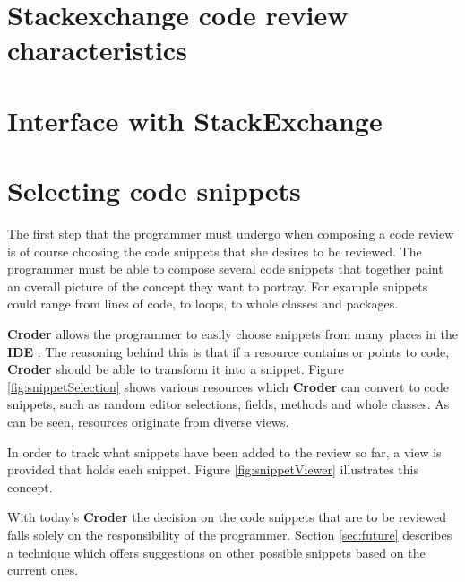 \documentclass{sigchi}
\newcommand{\croder}{\textbf{Croder }}
\newcommand{\IDE}{\textbf{IDE }}
\begin{document}
\section{Stackexchange code review characteristics}
\section{Interface with StackExchange}

\section{Selecting code snippets}

 The first step that the programmer must undergo when composing a code review is of course choosing the code snippets that she desires to be reviewed. The programmer must be able to compose several code snippets that together paint an overall picture of the concept they want to portray. For example snippets could range from lines of code, to loops, to whole classes and packages.

 \croder allows the programmer to easily choose snippets from many places in the \IDE. The reasoning behind this is that if a resource contains or points to code, \croder should be able to transform it into a snippet. Figure \ref{fig:snippetSelection} shows  various resources which \croder can convert to code snippets, such as random editor selections, fields, methods and whole classes. As can be seen, resources originate from diverse views.

 In order to track what snippets have been added to the review so far, a view is provided that holds each snippet. Figure \ref{fig:snippetViewer} illustrates this concept.
 
 With today's \croder the decision on the code snippets that are to be reviewed falls solely on the responsibility of the programmer. Section \ref{sec:future} describes a technique which offers suggestions on other possible snippets based on the current ones.
 
\end{document}
